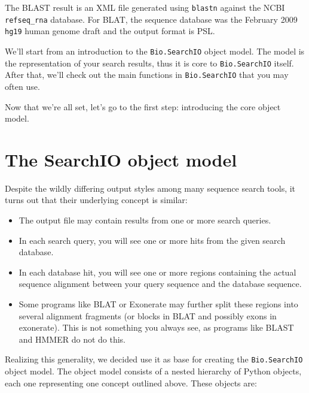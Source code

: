 The BLAST result is an XML file generated using \verb|blastn| against the NCBI
\verb|refseq_rna| database. For BLAT, the sequence database was the February 2009
\verb|hg19| human genome draft and the output format is PSL.

We'll start from an introduction to the \verb|Bio.SearchIO| object model. The
model is the representation of your search results, thus it is core to
\verb|Bio.SearchIO| itself. After that, we'll check out the main functions in
\verb|Bio.SearchIO| that you may often use.

Now that we're all set, let's go to the first step: introducing the core
object model.

\section{The SearchIO object model}
\label{sec:searchio-model}

Despite the wildly differing output styles among many sequence search tools,
it turns out that their underlying concept is similar:

\begin{itemize}
\item The output file may contain results from one or more search queries.
\item In each search query, you will see one or more hits from the given
search database.
\item In each database hit, you will see one or more regions containing the
actual sequence alignment between your query sequence and the database
sequence.
\item Some programs like BLAT or Exonerate may further split these regions into
several alignment fragments (or blocks in BLAT and possibly exons in
exonerate). This is not something you always see, as programs like BLAST and
HMMER do not do this.
\end{itemize}

Realizing this generality, we decided use it as base for creating the
\verb|Bio.SearchIO| object model. The object model consists of a nested
hierarchy of Python objects, each one representing one concept outlined above.
These objects are:

